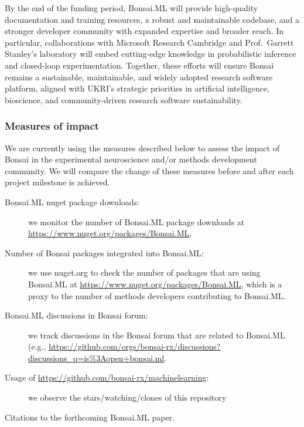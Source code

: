 By the end of the funding period, Bonsai.ML will provide high-quality
documentation and training resources, a robust and maintainable codebase, and a
stronger developer community with expanded expertise and broader reach. In
particular, collaborations with Microsoft Research Cambridge and Prof.~Garrett
Stanley’s laboratory will embed cutting-edge knowledge in probabilistic
inference and closed-loop experimentation. Together, these efforts will ensure
Bonsai remains a sustainable, maintainable, and widely adopted research
software platform, aligned with UKRI’s strategic priorities in artificial
intelligence, bioscience, and community-driven research software
sustainability.

\subsubsection*{Measures of impact}

We are currently using the measures described below to assess the impact of
Bonsai in the experimental neuroscience and/or methods development community.
We will compare the change of these measures before and after each project
milestone is achieved.

\begin{description}

    \item[Bonsai.ML nuget package downloads:] we monitor the number of
    Bonsai.ML package downloads at
    \url{https://www.nuget.org/packages/Bonsai.ML},

    \item[Number of Bonsai packages integrated into Bonsai.ML:] we use
    nuget.org to check the number of packages that are using Bonsai.ML at
    \url{https://www.nuget.org/packages/Bonsai.ML}, which is a proxy to the
    number of methods developers contributing to Bonsai.ML.

    \item[Bonsai.ML discussions in Bonsai forum:] we track discussions in the
    Bonsai forum that are related to Bonsai.ML (e.g.,
    \url{https://github.com/orgs/bonsai-rx/discussions?discussions_q=is%3Aopen+bonsai.ml}.

    \item[Usage of \url{https://github.com/bonsai-rx/machinelearning}:] we
    observe the stars/watching/clones of this repository

    \item[Citations to the forthcoming Bonsai.ML paper.]

\end{description}
